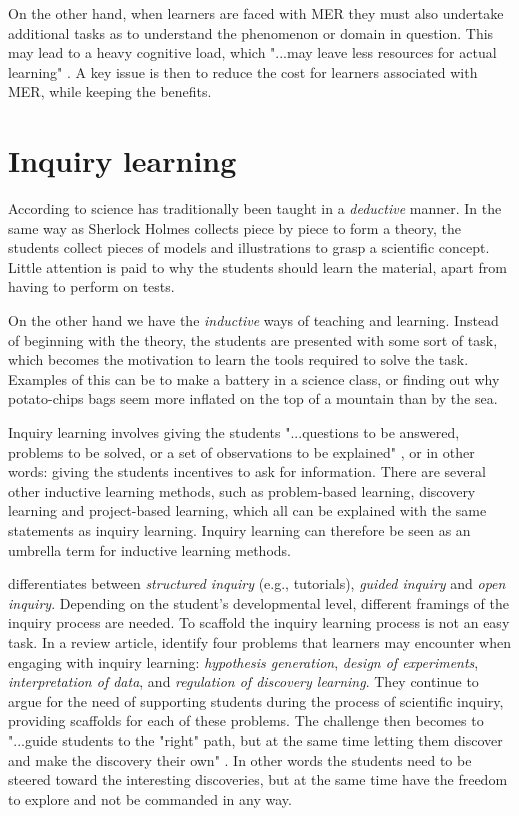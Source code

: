 On the other hand, when learners are faced with MER they must also undertake additional tasks as to understand the phenomenon or domain in question. This may lead to a heavy cognitive load, which "...may leave less resources for actual learning" \citetext{\citealp{sweller1988cognitive,sweller1989cognitive}, referenced in \citealp{van2006supporting}, p. 200}. A key issue is then to reduce the cost for learners associated with MER, while keeping the benefits. 

\section{Inquiry learning}
According to \citet{prince2006inductive} science has traditionally been taught in a \textit{deductive} manner. In the same way as Sherlock Holmes collects piece by piece to form a theory, the students collect pieces of models and illustrations to grasp a scientific concept. Little attention is paid to why the students should learn the material, apart from having to perform on tests.

On the other hand we have the \textit{inductive} ways of teaching and learning. Instead of beginning with the theory, the students are presented with some sort of task, which becomes the motivation to learn the tools required to solve the task. Examples of this can be to make a battery in a science class, or finding out why potato-chips bags seem more inflated on the top of a mountain than by the sea.

Inquiry learning involves giving the students "...questions to be answered, problems to be solved, or a set of observations to be explained" \citep[p. 127]{prince2006inductive}, or in other words: giving the students incentives to ask for information. There are several other inductive learning methods, such as problem-based learning, discovery learning and project-based learning, which all can be explained with the same statements as inquiry learning. Inquiry learning can therefore be seen as an umbrella term for inductive learning methods. \citep{prince2006inductive}

\citeauthor*{staver1987analysis} \citetext{\citeyear{staver1987analysis}, referenced in \citealp{prince2006inductive}} differentiates between \emph{structured inquiry} (e.g., tutorials), \emph{guided inquiry} and \emph{open inquiry}. Depending on the student's developmental level, different framings of the inquiry process are needed. To scaffold the inquiry learning process is not an easy task. In a review article, \citet{de1998scientific} identify four problems that learners may encounter when engaging with inquiry learning: \textit{hypothesis generation}, \textit{design of experiments}, \textit{interpretation of data}, and \textit{regulation of discovery learning}. They continue to argue for the need of supporting students during the process of scientific inquiry, providing scaffolds for each of these problems. The challenge then becomes to "...guide students to the "right" path, but at the
same time letting them discover and make the discovery their own" \citep[p. 247]{kluge2010simulation}. In other words the students need to be steered toward the interesting discoveries, but at the same time have the freedom to explore and not be commanded in any way.

